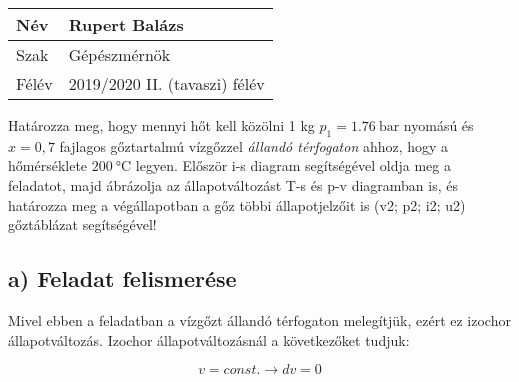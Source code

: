 
\usetikzlibrary{arrows.meta}
\usetikzlibrary{patterns}


\newcommand\pegy{0.176} %
\newcommand\TegyK{389.34} %
\newcommand\TegyC{116.19} %
\newcommand\vegy{0.699}
\newcommand\uegy{1913.2}
\newcommand\hegy{2036.3}
\newcommand\segy{5.4645}
\newcommand\xegy{0.7}
\newcommand\pvesszo{0.2575}
\newcommand\TvesszoK{401.52}
\newcommand\TvesszoC{128.37}
\newcommand\vvesszo{0.699}
\newcommand\uvesszo{2537.3}
\newcommand\hvesszo{2717.3}
\newcommand\svesszo{7.0419}
\newcommand\xvesszo{1}
\newcommand\pketto{0.3073}
\newcommand\TkettoK{473.15}
\newcommand\TkettoC{200}
\newcommand\vketto{0.699}
\newcommand\uketto{2649.5}
\newcommand\hketto{2864.3}
\newcommand\sketto{7.2992}

\newcommand\pontvastagsag{0.7 mm} %

\begin{tabular}{ | p{2cm} | p{14cm} | } 
	\hline
	Név & Rupert Balázs \\ 
	\hline
	Szak & Gépészmérnök\\ 
	\hline
	Félév & 2019/2020 II. (tavaszi) félév \\ 
	\hline
\end{tabular}
\vspace{0.5cm}

	Határozza meg, hogy mennyi hőt kell közölni 1 kg $p_1=\SI{1,76}{\bar}$ nyomású és $x = 0,7$ fajlagos gőztartalmú vízgőzzel \textit{állandó térfogaton} ahhoz, hogy a hőmérséklete $\SI{200}{\celsius}$ legyen. Először i-s diagram segítségével oldja meg a feladatot, majd ábrázolja az állapotváltozást T-s és p-v diagramban is, és határozza meg a végállapotban a gőz többi állapotjelzőit is (v2; p2; i2; u2) gőztáblázat segítségével!
	\vspace{2mm}

\subsection*{a) Feladat felismerése}
	Mivel ebben a feladatban a vízgőzt állandó térfogaton melegítjük, ezért ez izochor állapotváltozás.
	Izochor állapotváltozásnál a következőket tudjuk:
	
\begin{equation}
	v=const. \rightarrow dv=0
\end{equation}

